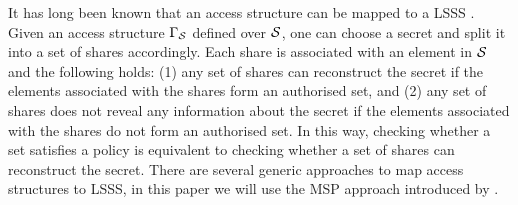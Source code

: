 It has long been known that an access structure can be mapped to a \ac{LSSS} \cite{ito89,bei96}. 
Given an access structure $\Gamma_\mathcal{S}$ defined over $\mathcal{S}$, one can choose a secret and split it into a set of shares accordingly. 
Each share is associated with an element in $\mathcal{S}$ and the following holds: 
(1) any set of shares can reconstruct the secret if the elements associated with the shares form an authorised set, and 
(2) any set of shares does not reveal any information about the secret if the elements associated with the shares do not form an authorised set.
In this way, checking whether a set satisfies a policy is equivalent to checking whether a set of shares can reconstruct the secret. 
There are several generic approaches to map access structures to \ac{LSSS}, in this paper we will use the \ac{MSP} approach introduced by \citet{bei96}. 


